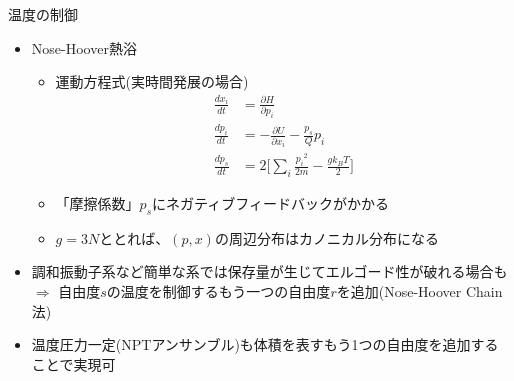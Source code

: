 
\begin{frame}[t,fragile]{温度の制御}
  \begin{itemize}
  \item Nose-Hoover熱浴
    \begin{itemize}
    \item 運動方程式(実時間発展の場合)
      \begin{align*}
        \frac{dx_i}{dt} &= \frac{\partial H}{\partial p_i} \\
        \frac{dp_i}{dt} &= -\frac{\partial U}{\partial x_i} -\frac{p_s}{Q} p_i \\
        \frac{dp_s}{dt} &= 2 \big[ \sum_i \frac{{p_i}^2}{2m} - \frac{g k_B T}{2} \big]
      \end{align*}
    \item 「摩擦係数」$p_s$にネガティブフィードバックがかかる
    \item $g=3N$ととれば、$(p,x)$の周辺分布はカノニカル分布になる
    \end{itemize}
  \item 調和振動子系など簡単な系では保存量が生じてエルゴード性が破れる場合も $\Rightarrow$ 自由度$s$の温度を制御するもう一つの自由度$r$を追加(Nose-Hoover Chain法) 
  \item 温度圧力一定(NPTアンサンブル)も体積を表すもう1つの自由度を追加することで実現可
  \end{itemize}
\end{frame}
